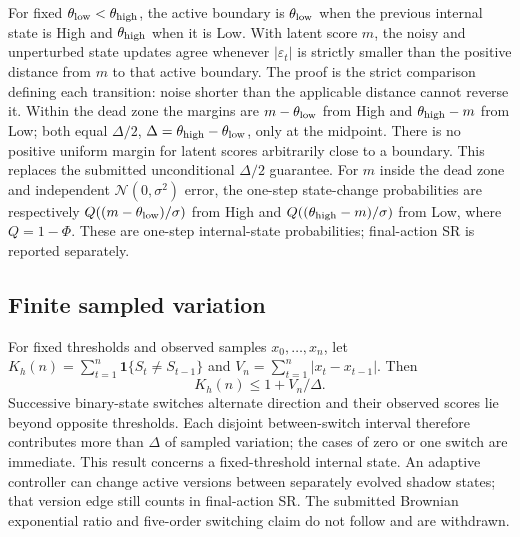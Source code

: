 \documentclass[10pt,onecolumn]{IEEEtran}
\begin{document}
For fixed \(\theta_{\rm low}<\theta_{\rm high}\), the active
boundary is \(\theta_{\rm low}\) when the previous internal
state is High and \(\theta_{\rm high}\) when it is Low. With
latent score \(m\), the noisy and unperturbed state updates
agree whenever \(|\varepsilon_t|\) is strictly smaller than
the positive distance from \(m\) to that active boundary.
The proof is the strict comparison defining each transition:
noise shorter than the applicable distance cannot reverse it.
Within the dead zone the margins are
\(m-\theta_{\rm low}\) from High and
\(\theta_{\rm high}-m\) from Low; both equal
\(\Delta/2\), \(\Delta=\theta_{\rm high}-\theta_{\rm low}\),
only at the midpoint. There is no positive uniform margin
for latent scores arbitrarily close to a boundary. This
replaces the submitted unconditional \(\Delta/2\) guarantee.
For \(m\) inside the dead zone and independent
\(\mathcal N(0,\sigma^2)\) error, the one-step state-change
probabilities are respectively
\(Q((m-\theta_{\rm low})/\sigma)\) from High and
\(Q((\theta_{\rm high}-m)/\sigma)\) from Low,
where \(Q=1-\Phi\). These are one-step internal-state
probabilities; final-action SR is reported separately.

\subsection{Finite sampled variation}
For fixed thresholds and observed samples \(x_0,\ldots,x_n\),
let \(K_h(n)=\sum_{t=1}^n\mathbf1\{S_t\ne S_{t-1}\}\) and
\(V_n=\sum_{t=1}^n|x_t-x_{t-1}|\). Then
\[
 K_h(n)\le1+V_n/\Delta. \tag{S1}
\]
Successive binary-state switches alternate direction and their
observed scores lie beyond opposite thresholds. Each disjoint
between-switch interval therefore contributes more than
\(\Delta\) of sampled variation; the cases of zero or one
switch are immediate. This result concerns a fixed-threshold
internal state. An adaptive controller can change active
versions between separately evolved shadow states; that
version edge still counts in final-action SR. The submitted
Brownian exponential ratio and five-order switching claim
do not follow and are withdrawn.
\end{document}
